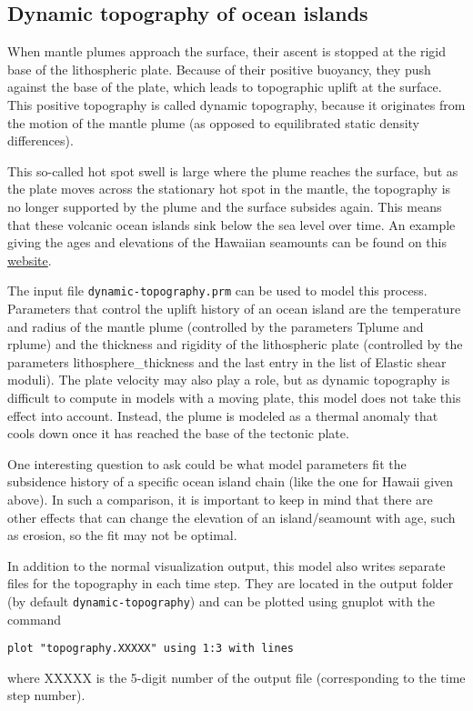 \documentclass[notitlepage]{article}
\begin{document}
\subsection{Dynamic topography of ocean islands}

When mantle plumes approach the surface, their ascent is stopped at the rigid base of the lithospheric plate. 
Because of their positive buoyancy, they push against the base of the plate, which leads to topographic uplift
at the surface. This positive topography is called dynamic topography, because it originates from the motion of 
the mantle plume (as opposed to equilibrated static density differences). 

This so-called hot spot swell is large where the plume reaches the surface, but as the plate moves across the 
stationary hot spot in the mantle, the topography is no longer supported by the plume and the surface subsides again. 
This means that these volcanic ocean islands sink below the sea level over time. An example giving the ages and 
elevations of the Hawaiian seamounts can be found on this \href{https://www.mtholyoke.edu/courses/mdyar/ast106/earth_hw_a.html}{website}.

The input file \texttt{dynamic-topography.prm} can be used to model this process. Parameters that control
the uplift history of an ocean island are the temperature and radius of the mantle plume (controlled by the parameters 
Tplume and rplume) and the thickness and rigidity of the lithospheric plate (controlled by the parameters 
lithosphere\_thickness and the last entry in the list of Elastic shear moduli). 
The plate velocity may also play a role, but as dynamic topography is difficult to compute in models with a moving plate, 
this model does not take this effect into account. Instead, the plume is modeled as a thermal anomaly that cools down once it has reached the base of the tectonic plate. 

One interesting question to ask could be what model parameters fit the subsidence
history of a specific ocean island chain (like the one for Hawaii given above). 
In such a comparison, it is important to keep in mind that there are other effects that can change the elevation of an island/seamount with age, such as erosion, so the fit may not be optimal. 

In addition to the normal visualization output, this model also writes separate files for the topography in each time step. 
They are located in the output folder (by default \texttt{dynamic-topography}) and can be plotted using gnuplot with the command
\begin{verbatim}
plot "topography.XXXXX" using 1:3 with lines
\end{verbatim} 
where XXXXX is the 5-digit number of the output file (corresponding to the time step number). 
\end{document}
